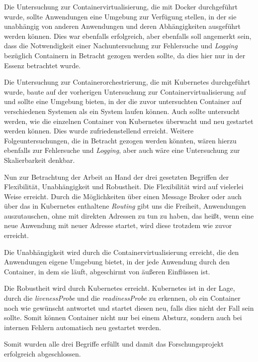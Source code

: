\documentclass[12pt,a4paper]{scrartcl}
\begin{document}
Die Untersuchung zur Containervirtualisierung, die mit Docker durchgeführt wurde, sollte Anwendungen eine Umgebung zur Verfügung stellen, in der sie unabhängig von anderen Anwendungen und deren Abhängigkeiten ausgeführt werden können. Dies war ebenfalls erfolgreich, aber ebenfalls soll angemerkt sein, dass die Notwendigkeit einer Nachuntersuchung zur Fehlersuche und \emph{Logging} bezüglich Containern in Betracht gezogen werden sollte, da dies hier nur in der Essenz betrachtet wurde.

Die Untersuchung zur Containerorchestrierung, die mit Kubernetes durchgeführt wurde, baute auf der vorherigen Untersuchung zur Containervirtualisierung auf und sollte eine Umgebung bieten, in der die zuvor untersuchten Container auf verschiedenen Systemen als ein System laufen können. Auch sollte untersucht werden, wie die einzelnen Container von Kubernetes überwacht und neu gestartet werden können. Dies wurde zufriedenstellend erreicht. Weitere Folgeuntersuchungen, die in Betracht gezogen werden könnten, wären hierzu ebenfalls zur Fehlersuche und \emph{Logging}, aber auch wäre eine Untersuchung zur Skalierbarkeit denkbar.

Nun zur Betrachtung der Arbeit an Hand der drei gesetzten Begriffen der Flexibilität, Unabhängigkeit und Robustheit.
Die Flexibilität wird auf vielerlei Weise erreicht. Durch die Möglichkeiten über einen Message Broker oder auch über das in Kubernetes enthaltene \emph{Routing} gibt uns die Freiheit, Anwendungen auszutauschen, ohne mit direkten Adressen zu tun zu haben, das heißt, wenn eine neue Anwendung mit neuer Adresse startet, wird diese trotzdem wie zuvor erreicht. 

Die Unabhängigkeit wird durch die Containervirtualisierung erreicht, die den Anwendungen eigene Umgebung bietet, in der jede Anwendung durch den Container, in dem sie läuft, abgeschirmt von äußeren Einflüssen ist.

Die Robustheit wird durch Kubernetes erreicht. Kubernetes ist in der Lage, durch die \emph{livenessProbe} und die \emph{readinessProbe} zu erkennen, ob ein Container noch wie gewünscht antwortet und startet diesen neu, falls dies nicht der Fall sein sollte. Somit können Container nicht nur bei einem Absturz, sondern auch bei internen Fehlern automatisch neu gestartet werden.

Somit wurden alle drei Begriffe erfüllt und damit das Forschungsprojekt erfolgreich abgeschlossen.


\newpage


\printbibliography
{}
\end{document}
